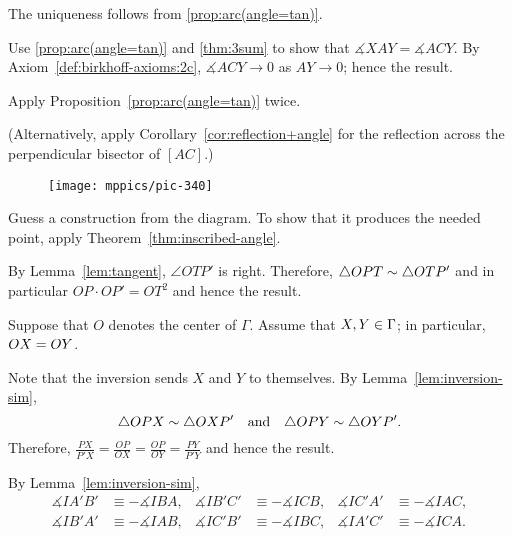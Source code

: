 The uniqueness follows from \ref{prop:arc(angle=tan)}.

 Use \ref{prop:arc(angle=tan)} and \ref{thm:3sum} to show that 
$\measuredangle XAY=\measuredangle ACY$.
By Axiom~\ref{def:birkhoff-axioms:2c}, $\measuredangle ACY\to 0$ as $AY\to 0$;
hence the result.

Apply Proposition~\ref{prop:arc(angle=tan)} twice.

(Alternatively, apply Corollary~\ref{cor:reflection+angle} for the reflection across the perpendicular bisector of $[AC]$.)

{

\begin{wrapfigure}{r}{32mm}
\vskip-8mm
\centering
\texttt{[image: mppics/pic-340]}
\end{wrapfigure}

 Guess a construction from the diagram.
To show that it produces the needed point, apply Theorem~\ref{thm:inscribed-angle}.

\setcounter{eqtn}{0}

By Lemma~\ref{lem:tangent}, $\angle OTP'$ is right. 
Therefore, $\triangle OPT\z\sim \triangle OTP'$
and in particular
$OP\cdot OP'=OT^2$
and hence the result.

Suppose that $O$ denotes the center of $\Gamma$.
Assume that $X,Y\z\in \Gamma$;
in particular, $OX\z=OY$.

}

Note that the inversion sends $X$ and $Y$ to themselves.
By Lemma~\ref{lem:inversion-sim},
$$\triangle OPX\z\sim \triangle OXP'
\quad
\text{and}
\quad
\triangle OPY\sim \triangle OYP'.$$
Therefore, 
$\frac{PX}{P'X}=\frac{OP}{OX}=\frac{OP}{OY}=\frac{PY}{P'Y}$
and hence the result.

By Lemma~\ref{lem:inversion-sim},
\begin{align*}
\measuredangle IA'B'&\equiv -\measuredangle IBA,
&
\measuredangle IB'C'&\equiv -\measuredangle ICB,
&
\measuredangle IC'A'&\equiv -\measuredangle IAC,
\\
\measuredangle IB'A'&\equiv -\measuredangle IAB,
&
\measuredangle IC'B'&\equiv -\measuredangle IBC,
&
\measuredangle IA'C'&\equiv -\measuredangle ICA.
\end{align*}

